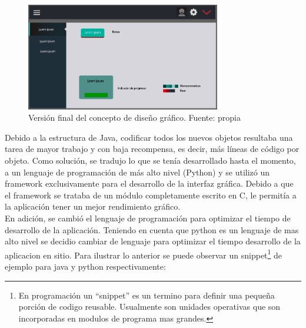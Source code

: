 \begin{figure}[htbp]
	\centerline{\includegraphics[width=8.5cm]{./figuras/house_manager_version_3.png}}
	\caption{Versión final del concepto de diseño gráfico. Fuente: propia}
	\label{fig_22}
\end{figure}

Debido a la estructura de Java, codificar todos los nuevos objetos resultaba una tarea de mayor trabajo y con baja recompensa, es decir, más líneas de código por objeto. Como solución, se tradujo lo que se tenía desarrollado hasta el momento, a un lenguaje de programación de más alto nivel (Python) y se utilizó un framework exclusivamente para el desarrollo de la interfaz gráfica. Debido a que el framework se trataba de un módulo completamente escrito en C, le permitía a la aplicación tener un mejor rendimiento gráfico.
\vspace{0.5cm}\\
En adición, se cambió el lenguaje de programación para optimizar el tiempo de desarrollo de la aplicación. Teniendo en cuenta que python es un lenguaje de mas alto nivel se decidio cambiar de lenguaje para optimizar el tiempo desarrollo de la aplicacion en sitio. Para ilustrar lo anterior se puede observar un snippet\footnote{En programación un ``snippet'' es un termino para definir una pequeña porción de codigo reusable. Usualmente son unidades operativas que son incorporadas en modulos de programa mas grandes.} de ejemplo para java y python respectivamente:

